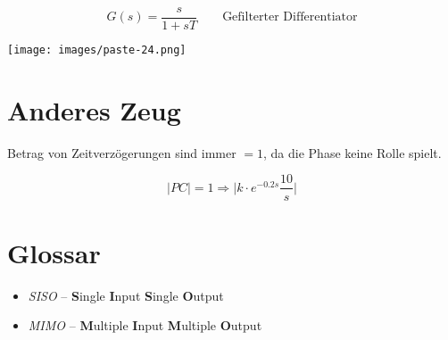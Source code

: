 \documentclass[
  10pt,
  a4paper,
  twocolumn]{article}
\providecommand{\tightlist}{%
  \setlength{\itemsep}{0pt}\setlength{\parskip}{0pt}}\usepackage{longtable,booktabs,array}
\numberwithin{equation}{section}
\begin{document}
\[
G(s)=\frac{s}{1+sT} \qquad \text{Gefilterter Differentiator}
\]

\texttt{[image: images/paste-24.png]}

\section{Anderes Zeug}\label{anderes-zeug}

Betrag von Zeitverzögerungen sind immer \(=1\), da die Phase keine Rolle
spielt.

\[
|PC| = 1 \Rightarrow \lvert k \cdot e^{-0.2s} \frac{10}{s}\rvert
\]

\section{Glossar}\label{glossar}

\begin{itemize}
\tightlist
\item
  \emph{SISO} -- \textbf{S}ingle \textbf{I}nput \textbf{S}ingle
  \textbf{O}utput
\item
  \emph{MIMO} -- \textbf{M}ultiple \textbf{I}nput \textbf{M}ultiple
  \textbf{O}utput
\end{itemize}
\end{document}

